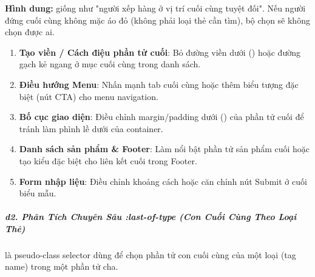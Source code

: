 \begin{tipBox}
\textbf{Hình dung:}  giống như "người xếp hàng ở vị trí cuối cùng tuyệt đối". Nếu người đứng cuối cùng không mặc áo đỏ (không phải loại thẻ cần tìm), bộ chọn  sẽ không chọn được ai.
\end{tipBox}

\begin{conceptBox}
\begin{enumerate}[leftmargin=1.5em, itemsep=3pt, parsep=0pt]
    \item \textbf{Tạo viền / Cách điệu phần tử cuối}: Bỏ đường viền dưới () hoặc đường gạch kẻ ngang ở mục cuối cùng trong danh sách.
    \item \textbf{Điều hướng Menu}: Nhấn mạnh tab cuối cùng hoặc thêm biểu tượng đặc biệt (nút CTA) cho menu navigation.
    \item \textbf{Bố cục giao diện}: Điều chỉnh margin/padding dưới () của phần tử cuối để tránh làm phình lề dưới của container.
    \item \textbf{Danh sách sản phẩm \& Footer}: Làm nổi bật phần tử sản phẩm cuối hoặc tạo kiểu đặc biệt cho liên kết cuối trong Footer.
    \item \textbf{Form nhập liệu}: Điều chỉnh khoảng cách hoặc căn chỉnh nút Submit ở cuối biểu mẫu.
\end{enumerate}
\end{conceptBox}


\subparagraph{d2. Phân Tích Chuyên Sâu :last-of-type (Con Cuối Cùng Theo Loại Thẻ)}

 là pseudo-class selector dùng để chọn phần tử con cuối cùng của một loại (tag name) trong một phần tử cha.


